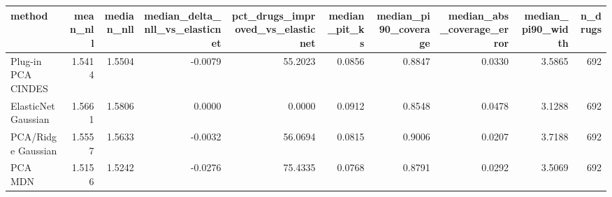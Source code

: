 \begin{tabular}{lrrrrrrrrr}
\toprule
method & mean\_nll & median\_nll & median\_delta\_nll\_vs\_elasticnet & pct\_drugs\_improved\_vs\_elasticnet & median\_pit\_ks & median\_pi90\_coverage & median\_abs\_coverage\_error & median\_pi90\_width & n\_drugs \\
\midrule
Plug-in PCA CINDES & 1.5414 & 1.5504 & -0.0079 & 55.2023 & 0.0856 & 0.8847 & 0.0330 & 3.5865 & 692 \\
ElasticNet Gaussian & 1.5661 & 1.5806 & 0.0000 & 0.0000 & 0.0912 & 0.8548 & 0.0478 & 3.1288 & 692 \\
PCA/Ridge Gaussian & 1.5557 & 1.5633 & -0.0032 & 56.0694 & 0.0815 & 0.9006 & 0.0207 & 3.7188 & 692 \\
PCA MDN & 1.5156 & 1.5242 & -0.0276 & 75.4335 & 0.0768 & 0.8791 & 0.0292 & 3.5069 & 692 \\
\bottomrule
\end{tabular}

